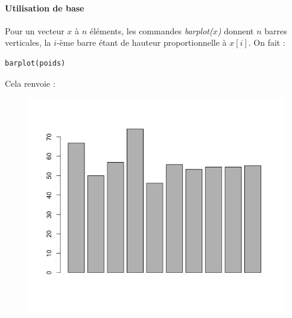 \paragraph{Utilisation de base}
Pour un vecteur $x$ à $n$ éléments, les commandes \textit{barplot($x$)} donnent $n$ barres verticales, la $i$-ème barre étant de hauteur proportionnelle à $x[i]$. On fait :
\begin{lstlisting}[language=html]
barplot(poids)
\end{lstlisting}
Cela renvoie :
\begin{figure}[H]\begin{center}\includegraphics[scale=0.4]{ilu/gra30.png}\end{center}\end{figure}
